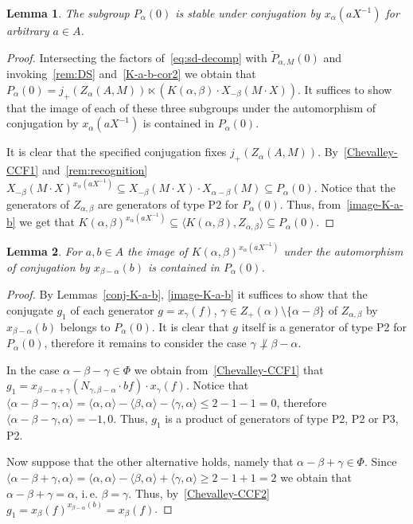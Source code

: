 \documentclass[oneside, 8pt]{amsart}
\newtheorem{lemma}{Lemma}
\theoremstyle{remark}
\theoremstyle{definition}
\numberwithin{lemma}{section}
\numberwithin{prop}{section}
\numberwithin{corollary}{section}
\numberwithin{externaltheorem}{section}
\numberwithin{equation}{section}
\begin{document}
\begin{lemma} \label{P0_conj} The subgroup $P_\alpha(0)$ is stable under conjugation by $x_\alpha(aX^{-1})$ for arbitrary $a \in A$. \end{lemma}
\begin{proof} 
Intersecting the factors of~\eqref{eq:sd-decomp} with $\widetilde{P}_{\alpha, M}(0)$ and invoking~\cref{rem:DS} and~\cref{K-a-b-cor2} we obtain that $P_{\alpha}(0) =  j_+(Z_\alpha(A, M)) \ltimes \left(K(\alpha, \beta) \cdot X_{-\beta}(M \cdot X)\right).$
It suffices to show that the image of each of these three subgroups under the automorphism of conjugation by $x_\alpha(aX^{-1})$ is contained in $P_\alpha(0)$.

It is clear that the specified conjugation fixes $j_+(Z_\alpha(A, M))$. By~\eqref{Chevalley-CCF1} and~\cref{rem:recognition} 
$X_{-\beta}(M\cdot X)^{x_\alpha(aX^{-1})} \subseteq X_{-\beta}(M\cdot X) \cdot X_{\alpha-\beta}(M) \subseteq P_\alpha(0).$ 
Notice that the generators of $Z_{\alpha,\beta}$ are generators of type P2 for $P_\alpha(0)$.
Thus, from~\cref{image-K-a-b} we get that
$K(\alpha, \beta)^{x_\alpha(aX^{-1})} \subseteq \langle K(\alpha, \beta), Z_{\alpha, \beta} \rangle \subseteq P_\alpha(0)$.
\end{proof}

\begin{lemma} \label{conj-S-a-x-bma} For $a, b\in A$ the image of $K(\alpha,\beta)^{x_\alpha(aX^{-1})}$ under the automorphism of conjugation by $x_{\beta-\alpha}(b)$ is contained in $P_\alpha(0)$. \end{lemma}
\begin{proof} By Lemmas~\ref{conj-K-a-b}, \ref{image-K-a-b} it suffices to show that the conjugate $g_1$ of each generator $g = x_\gamma(f)$, $\gamma \in Z_+(\alpha) \setminus \{ \alpha - \beta \}$ of $Z_{\alpha, \beta}$ by $x_{\beta-\alpha}(b)$ belongs to $P_\alpha(0)$. It is clear that $g$ itself is a generator of type P2 for $P_\alpha(0)$, therefore it remains to consider the case $\gamma\not \perp \beta - \alpha$. 
 
In the case $\alpha - \beta - \gamma \in \Phi$ we obtain from~\eqref{Chevalley-CCF1} that
$g_1 = x_{\beta - \alpha + \gamma} (N_{\gamma, \beta -\alpha}\cdot bf)     \cdot x_{\gamma}(f).$ Notice that $\langle \alpha - \beta - \gamma, \alpha \rangle = \langle \alpha, \alpha \rangle - \langle \beta, \alpha \rangle - \langle \gamma, \alpha \rangle \leq 2 - 1 - 1 = 0$, 
 therefore $\langle \alpha - \beta - \gamma, \alpha \rangle = -1,0$. Thus, $g_1$ is a product of generators of type P2, P2 or P3, P2.

Now suppose that the other alternative holds, namely that $\alpha - \beta + \gamma \in \Phi$.
Since $\langle \alpha - \beta + \gamma, \alpha \rangle = \langle \alpha , \alpha \rangle - \langle \beta, \alpha \rangle + \langle \gamma, \alpha \rangle \geq 2 - 1 + 1 = 2$
we obtain that $\alpha - \beta + \gamma = \alpha$, i.\,e. $\beta=\gamma$. Thus, by~\eqref{Chevalley-CCF2} $g_1 = x_\beta(f)^{x_{\beta-\alpha}(b)} = x_\beta(f)$. \end{proof}
\end{document}

